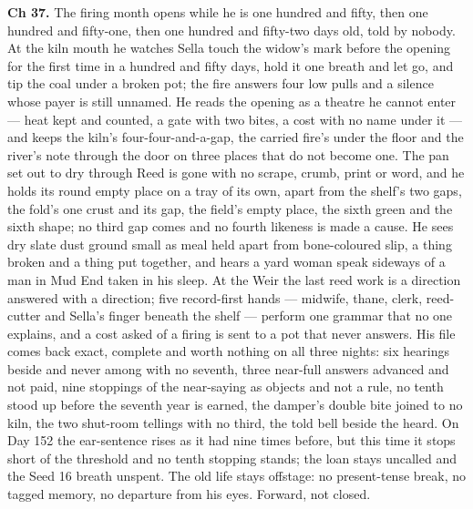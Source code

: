 \documentclass{design/chronicle}
\begin{document}
{\textbf{Ch 37.} The firing month opens while he is one hundred and fifty, then one hundred and fifty-one, then one hundred and fifty-two days old, told by nobody. At the kiln mouth he watches Sella touch the widow’s mark before the opening for the first time in a hundred and fifty days, hold it one breath and let go, and tip the coal under a broken pot; the fire answers four low pulls and a silence whose payer is still unnamed. He reads the opening as a theatre he cannot enter --- heat kept and counted, a gate with two bites, a cost with no name under it --- and keeps the kiln’s four-four-and-a-gap, the carried fire’s under the floor and the river’s note through the door on three places that do not become one. The pan set out to dry through Reed is gone with no scrape, crumb, print or word, and he holds its round empty place on a tray of its own, apart from the shelf’s two gaps, the fold’s one crust and its gap, the field’s empty place, the sixth green and the sixth shape; no third gap comes and no fourth likeness is made a cause. He sees dry slate dust ground small as meal held apart from bone-coloured slip, a thing broken and a thing put together, and hears a yard woman speak sideways of a man in Mud End taken in his sleep. At the Weir the last reed work is a direction answered with a direction; five record-first hands --- midwife, thane, clerk, reed-cutter and Sella’s finger beneath the shelf --- perform one grammar that no one explains, and a cost asked of a firing is sent to a pot that never answers. His file comes back exact, complete and worth nothing on all three nights: six hearings beside and never among with no seventh, three near-full answers advanced and not paid, nine stoppings of the near-saying as objects and not a rule, no tenth stood up before the seventh year is earned, the damper’s double bite joined to no kiln, the two shut-room tellings with no third, the told bell beside the heard. On Day 152 the ear-sentence rises as it had nine times before, but this time it stops short of the threshold and no tenth stopping stands; the loan stays uncalled and the Seed 16 breath unspent. The old life stays offstage: no present-tense break, no tagged memory, no departure from his eyes. Forward, not closed.

}
\end{document}
